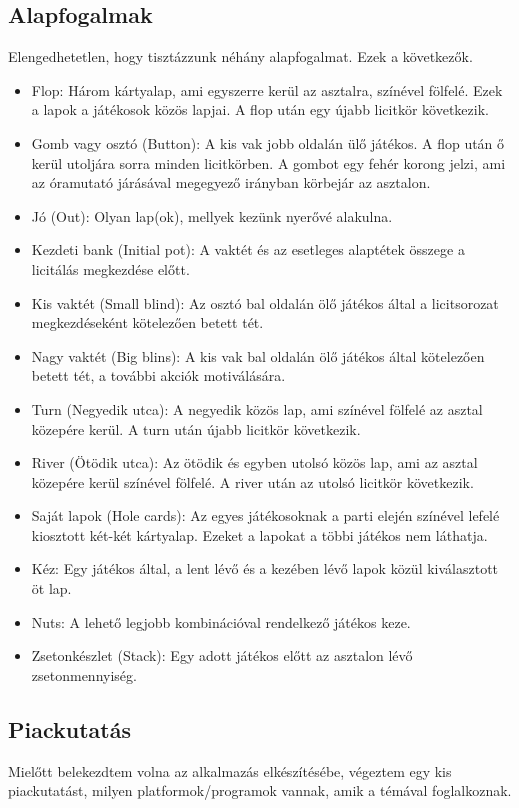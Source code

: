 \subsection{Alapfogalmak}
Elengedhetetlen, hogy tisztázzunk néhány alapfogalmat. Ezek a következők.
\cite{harrington}
\begin{itemize}
\item Flop: Három kártyalap, ami egyszerre kerül az asztalra, színével fölfelé. Ezek a lapok a játékosok közös lapjai. A flop után egy újabb licitkör következik.
\item Gomb vagy osztó (Button): A kis vak jobb oldalán ülő játékos. A flop után ő kerül utoljára sorra minden licitkörben. A gombot egy fehér korong jelzi, ami az óramutató járásával megegyező irányban körbejár az asztalon.
\item Jó (Out): Olyan lap(ok), mellyek kezünk nyerővé alakulna.
\item Kezdeti bank (Initial pot): A vaktét és az esetleges alaptétek összege a licitálás megkezdése előtt.
\item Kis vaktét (Small blind): Az osztó bal oldalán ölő játékos által a licitsorozat megkezdéseként kötelezően betett tét.
\item Nagy vaktét (Big blins): A kis vak bal oldalán ölő játékos által kötelezően betett tét, a további akciók motiválására.
\item Turn (Negyedik utca): A negyedik közös lap, ami színével fölfelé az asztal közepére kerül. A turn után újabb licitkör következik.
\item River (Ötödik utca): Az ötödik és egyben utolsó közös lap, ami az asztal közepére kerül színével fölfelé. A river után az utolsó licitkör következik.
\item Saját lapok (Hole cards): Az egyes játékosoknak a parti elején színével lefelé kiosztott két-két kártyalap. Ezeket a lapokat a többi játékos nem láthatja.
\item Kéz: Egy játékos által, a lent lévő és a kezében lévő lapok közül kiválasztott öt lap.
\item Nuts: A lehető legjobb kombinációval rendelkező játékos keze.
\item Zsetonkészlet (Stack): Egy adott játékos előtt az asztalon lévő zsetonmennyiség.
\end{itemize}

\subsection{Piackutatás}
Mielőtt belekezdtem volna az alkalmazás elkészítésébe, végeztem egy kis piackutatást, milyen platformok/programok vannak, amik a témával foglalkoznak.

